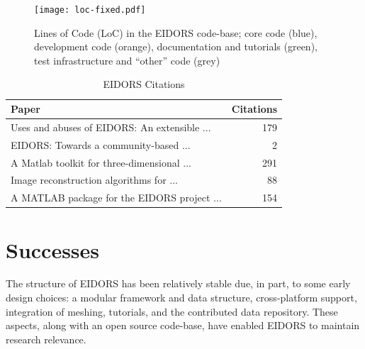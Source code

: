 \documentclass[10pt,a4paper]{article}
\begin{document}
\begin{multicols}{2}
\begin{figure}[H]
  \vspace{-2.5em}
\centering
\texttt{[image: loc-fixed.pdf]}
\caption{\label{fig:loc}%
  Lines of Code (LoC) in the EIDORS code-base; core code (blue), development code (orange),
  documentation and tutorials (green), test infrastructure and ``other'' code (grey)
}
\end{figure}
\vspace{-1.5em}
\begin{table}[H]
  \footnotesize
\centering
\caption{\label{tbl:cite} EIDORS Citations}
\begin{tabular}{lr}
  \toprule
  Paper & Citations \\
  \midrule
  \cite{adler2006} Uses and abuses of {EIDORS}: An extensible {\tiny ...} & 179 \\
  \cite{adler2005} EIDORS: Towards a community-based {\tiny ...}  & 2 \\
  \cite{polydorides2002matlab} A Matlab toolkit for three-dimensional {\tiny ...}  & 291 \\
  \cite{polydorides2002phd} Image reconstruction algorithms for {\tiny ...}  & 88 \\
  \cite{vauhkonen2001} A MATLAB package for the EIDORS project {\tiny ...}  & 154 \\
  \bottomrule
\end{tabular}
\vspace{-1em}
\end{table}

\section{Successes}
The structure of EIDORS has been relatively stable due, in part, to some early design choices:
a modular framework and data structure,
cross-platform support, integration of meshing,
tutorials, and the contributed data repository.
These aspects, along with an open source code-base, have enabled EIDORS to
maintain research relevance.


\end{multicols}
\end{document}
